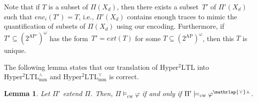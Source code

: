 \documentclass[dvipsnames,10pt,a4paper]{amsart}
\newtheorem{lem}[thm]{Lemma}
\theoremstyle{definition}
\theoremstyle{remark}
\renewcommand{\phi}{\varphi}
\newcommand{\pow}[1]{2^{#1}}
\newcommand{\sohyltl}{\mathrm{Hyper^2LTL}\xspace}
\newcommand{\sohyltlfpmax}{\mathrm{Hyper^2LTL_{\mathrm{mm}}^{\largest}}\xspace}
\newcommand{\sohyltlfpmin}{\mathrm{Hyper^2LTL_{\mathrm{mm}}^{\smallest}}\xspace}
\newcommand{\ap}[0]{\mathrm{AP}}
\newcommand{\unidisvar}{X_d}
\newcommand{\smallest}{\curlyvee}
\newcommand{\largest}{\curlywedge}
\newcommand{\smalar}{{\mathrlap{\curlyvee}\curlywedge}}
\newcommand{\cw}{\mathrm{cw}}
\newcommand{\enc}{\mathit{enc}}
\newcommand{\extend}{\mathit{ext}}
\begin{document}
Note that if $T$ is a subset of $\Pi(\unidisvar)$, then there exists a subset~$T'$ of $\Pi'(\unidisvar)$ such that $\enc_i(T') = T$, i.e., $\Pi'(\unidisvar)$ contains enough traces to mimic the quantification of subsets of $\Pi(\unidisvar)$ using our encoding.
Furthermore, if $T' \subseteq (\pow{\ap'})^\omega$  has the form~$T' = \extend(T)$ for some $T \subseteq (\pow{\ap})^\omega$, then this $T$ is unique.

The following lemma states that our translation of $\sohyltl$ into $\sohyltlfpmax$ and $\sohyltlfpmin$ is correct. 

\begin{lem}
\label{lemma_mmcorrectness}
Let $\Pi'$ extend $\Pi$. Then, $\Pi \models_\cw \phi$ if and only if $\Pi' \models_\cw \varphi^{\smalar}$.
\end{lem}
\end{document}
